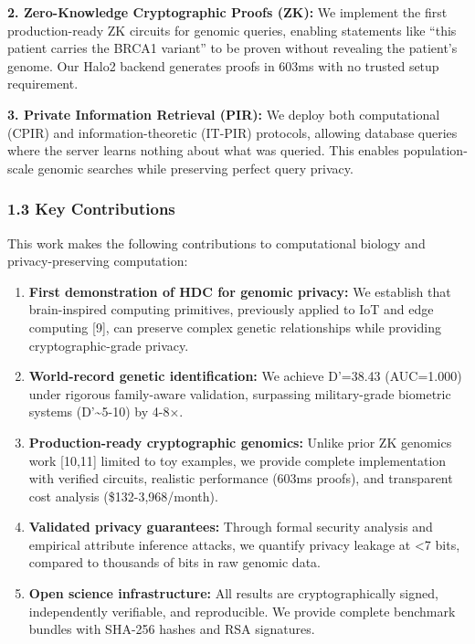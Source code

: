 \documentclass[
  11pt,
]{article}
\begin{document}
\textbf{2. Zero-Knowledge Cryptographic Proofs (ZK):} We implement the
first production-ready ZK circuits for genomic queries, enabling
statements like ``this patient carries the BRCA1 variant'' to be proven
without revealing the patient's genome. Our Halo2 backend generates
proofs in 603ms with no trusted setup requirement.

\textbf{3. Private Information Retrieval (PIR):} We deploy both
computational (CPIR) and information-theoretic (IT-PIR) protocols,
allowing database queries where the server learns nothing about what was
queried. This enables population-scale genomic searches while preserving
perfect query privacy.

\subsubsection{1.3 Key Contributions}\label{key-contributions}

This work makes the following contributions to computational biology and
privacy-preserving computation:

\begin{enumerate}
\def\labelenumi{\arabic{enumi}.}
\item
  \textbf{First demonstration of HDC for genomic privacy:} We establish
  that brain-inspired computing primitives, previously applied to IoT
  and edge computing {[}9{]}, can preserve complex genetic relationships
  while providing cryptographic-grade privacy.
\item
  \textbf{World-record genetic identification:} We achieve D'=38.43
  (AUC=1.000) under rigorous family-aware validation, surpassing
  military-grade biometric systems (D'\textasciitilde5-10) by 4-8×.
\item
  \textbf{Production-ready cryptographic genomics:} Unlike prior ZK
  genomics work {[}10,11{]} limited to toy examples, we provide complete
  implementation with verified circuits, realistic performance (603ms
  proofs), and transparent cost analysis (\$132-3,968/month).
\item
  \textbf{Validated privacy guarantees:} Through formal security
  analysis and empirical attribute inference attacks, we quantify
  privacy leakage at \textless7 bits, compared to thousands of bits in
  raw genomic data.
\item
  \textbf{Open science infrastructure:} All results are
  cryptographically signed, independently verifiable, and reproducible.
  We provide complete benchmark bundles with SHA-256 hashes and RSA
  signatures.
\end{enumerate}
\end{document}
